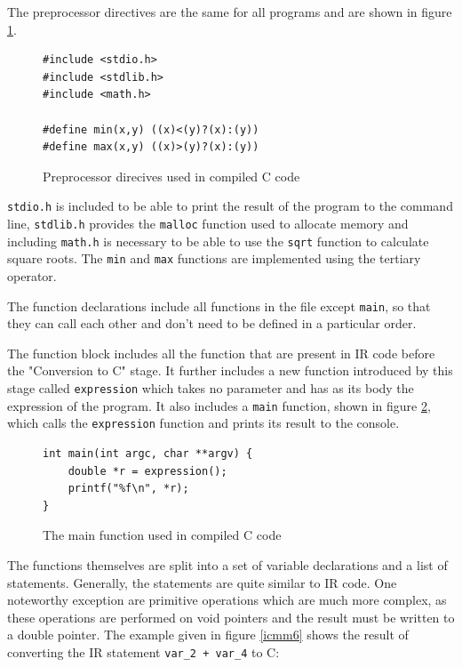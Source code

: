 \documentclass[11pt]{report}
\begin{document}
The preprocessor directives are the same for all programs and are shown in figure \ref{icmm4}.

\begin{figure}[ht]
\begin{lstlisting}
#include <stdio.h>
#include <stdlib.h>
#include <math.h>
    
#define min(x,y) ((x)<(y)?(x):(y))
#define max(x,y) ((x)>(y)?(x):(y))
\end{lstlisting}
\caption{Preprocessor direcives used in compiled C code}
\label{icmm4}
\end{figure}

\texttt{stdio.h} is included to be able to print the result of the program to the command line, \texttt{stdlib.h} provides the \texttt{malloc} function used to allocate memory and including \texttt{math.h} is necessary to be able to use the \texttt{sqrt} function to calculate square roots. The \texttt{min} and \texttt{max} functions are implemented using the tertiary operator.

The function declarations include all functions in the file except \texttt{main}, so that they can call each other and don't need to be defined in a particular order.

The function block includes all the function that are present in IR code before the "Conversion to C" stage. It further includes a new function introduced by this stage called \texttt{expression} which takes no parameter and has as its body the expression of the program. It also includes a \texttt{main} function, shown in figure \ref{icmm5}, which calls the \texttt{expression} function and prints its result to the console.

\begin{figure}[ht]
\begin{lstlisting}
int main(int argc, char **argv) {
    double *r = expression();
    printf("%f\n", *r);
}
\end{lstlisting}
\caption{The main function used in compiled C code}
\label{icmm5}
\end{figure}

The functions themselves are split into a set of variable declarations and a list of statements. Generally, the statements are quite similar to IR code. One noteworthy exception are primitive operations which are much more complex, as these operations are performed on void pointers and the result must be written to a double pointer. The example given in figure \ref{icmm6} shows the result of converting the IR statement \texttt{var_2 + var_4} to C:
\end{document}
